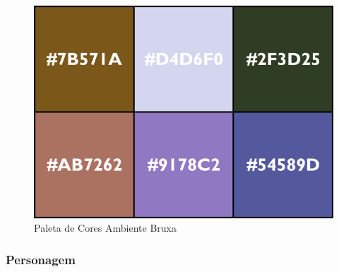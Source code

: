 \clearpage

\begin{figure}[htb]
	\caption{\label{fig_paletaKilin}Paleta de Cores Ambiente Bruxa}
	\begin{center}
	    \includegraphics[width=\textwidth/2]{imagens/PaletaKilin.png}
	\end{center}
\end{figure}

\subsubsection{Personagem}




